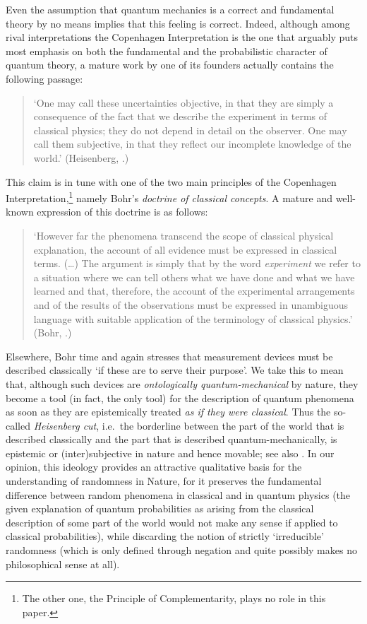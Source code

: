 \documentclass[12pt]{article}
\begin{document}
Even the assumption that quantum mechanics is a correct and fundamental theory by no means implies that 
 this feeling is correct. Indeed,  although among rival interpretations the Copenhagen Interpretation is the one that arguably puts most emphasis on both the fundamental and the probabilistic character of quantum theory,  
 a mature work by one of its founders actually contains the following passage:
\begin{quote} `One may call these uncertainties objective, in that they are simply a consequence of the fact that we describe the experiment in terms of classical physics; they do not depend in detail on the observer. One may call them subjective, in that they reflect our incomplete knowledge of the world.' (Heisenberg, \cite[pp.\ 53--54]{heis}.)
\end{quote}
This claim is in tune with one of the two main principles of the Copenhagen Interpretation,\footnote{The other
one, the Principle of Complementarity, plays no role in this paper.}
 namely Bohr's
{\it doctrine of classical concepts}. A mature and well-known expression of this doctrine is as follows:
 \begin{quote}
 `However far the phenomena transcend the scope of classical physical explanation, the account of all evidence must be expressed in classical terms. (\ldots) The argument is simply that by the word {\it experiment} we refer to a situation where we can tell others what we have done and what we have learned and that, therefore, the account of the experimental arrangements and of the results of the observations must be expressed in unambiguous language with suitable application of the terminology of classical physics.'
  (Bohr, \cite[p.\ 209]{bohr}.)
 \end{quote}
Elsewhere, Bohr time and again stresses that measurement devices must be described classically
 `if these are to serve their purpose'. We take this to mean that, although such devices are \emph{ontologically quantum-mechanical} by nature,  they become a tool (in fact, the only tool) for the description of quantum phenomena as soon as they are epistemically treated \emph{as if they were classical}. Thus the so-called {\it Heisenberg cut}, i.e.\ the borderline between the part of the world that is described classically and the part that is described 
 quantum-mechanically, is epistemic or (inter)subjective in nature and hence movable; see also \cite{24,SC}.
In our opinion, this ideology provides an attractive qualitative basis for the understanding of randomness in Nature, for it preserves the fundamental difference between random phenomena in classical and in quantum physics (the given explanation of quantum probabilities as arising from the classical description of some part of the world would not make any sense if applied to classical probabilities),  while discarding the notion of strictly `irreducible' randomness (which is only defined through negation and quite possibly makes no philosophical sense at all). 
\end{document}
